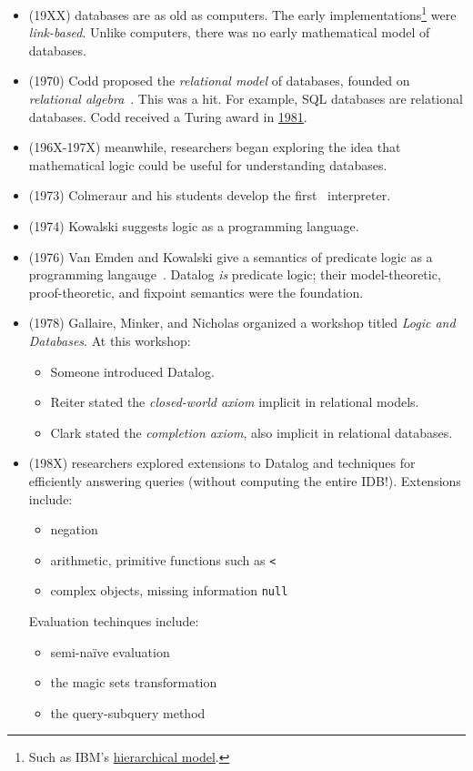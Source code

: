 \documentclass{article}
\begin{document}
\begin{itemize}
\item (19XX) databases are as old as computers.
  The early implementations\footnote{Such as IBM's \href{https://en.wikipedia.org/wiki/Hierarchical_database_model}{hierarchical model}.} were \emph{link-based}.
  Unlike computers, there was no early mathematical model of databases.
\item (1970) Codd proposed the \emph{relational model} of databases, founded on \emph{relational algebra}~\cite{c-cacm-1970}.
  This was a hit.
  For example, \textsf{SQL} databases are relational databases.
  Codd received a Turing award in \href{http://amturing.acm.org/award_winners/codd_1000892.cfm}{1981}.
\item (196X-197X) meanwhile, researchers began exploring the idea that mathematical logic could be useful for understanding databases.
\item (1973) Colmeraur and his students develop the first \prolog\ interpreter.
\item (1974) Kowalski suggests logic as a programming language.
\item (1976) Van Emden and Kowalski give a semantics of predicate logic as a programming langauge~\cite{vk-jacm-1976}.
  Datalog \emph{is} predicate logic; their model-theoretic, proof-theoretic, and fixpoint semantics were the foundation.
\item (1978) Gallaire, Minker, and Nicholas organized a workshop titled \emph{Logic and Databases}.
  At this workshop:
  \begin{itemize}
  \item Someone introduced Datalog.
  \item Reiter stated the \emph{closed-world axiom} implicit in relational models.
  \item Clark stated the \emph{completion axiom}, also implicit in relational databases.
  \end{itemize}
\item (198X) researchers explored extensions to Datalog and techniques for efficiently answering queries (without computing the entire IDB!).
  Extensions include:
  \begin{itemize}
  \item negation
  \item arithmetic, primitive functions such as {\tt <}
  \item complex objects, missing information {\tt null}
  \end{itemize}

  Evaluation techinques include:
  \begin{itemize}
  \item semi-na\"ive evaluation
  \item the magic sets transformation
  \item the query-subquery method
  \end{itemize}
\end{itemize}
\end{document}
